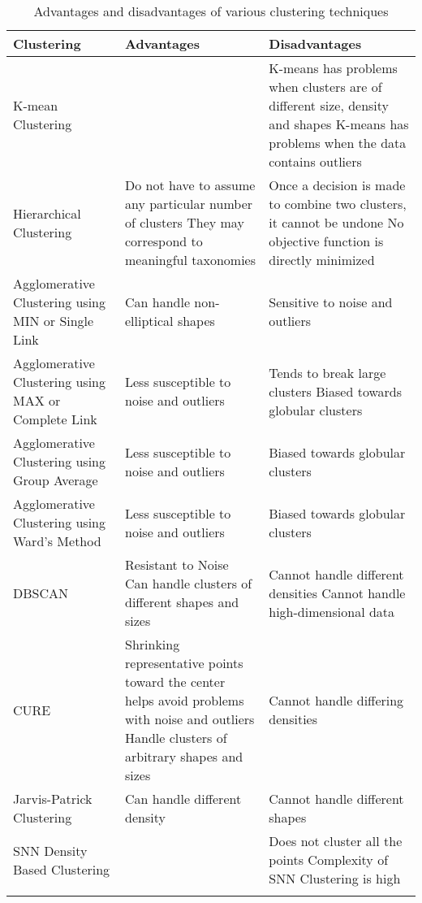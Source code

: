 \begin{longtable}{ | P{3cm} | P{5cm} | P{5cm} | } 
\hline
    \textbf{Clustering} & \textbf{Advantages} & \textbf{Disadvantages} \\ \hline
    K-mean Clustering & 
    &
        K-means has problems when clusters are of different size, density and shapes \newline \newline
        K-means has problems when the data contains outliers
    \\ \hline
    Hierarchical Clustering &
        Do not have to assume any particular number of clusters \newline \newline
        They may correspond to meaningful taxonomies 
    &
        Once a decision is made to combine two clusters, it cannot be undone \newline \newline
        No objective function is directly minimized
    \\ \hline
    Agglomerative Clustering using MIN or Single Link & 
        Can handle non-elliptical shapes
    &
        Sensitive to noise and outliers
    \\ \hline
    Agglomerative Clustering using MAX or Complete Link &
        Less susceptible to noise and outliers
    &
        Tends to break large clusters \newline \newline
        Biased towards globular clusters
    \\ \hline
    Agglomerative Clustering using Group Average &
        Less susceptible to noise and outliers
    &
        Biased towards globular clusters
    \\ \hline
        Agglomerative Clustering using Ward's Method &
        Less susceptible to noise and outliers
    &
        Biased towards globular clusters
    \\ \hline
    DBSCAN &
        Resistant to Noise \newline \newline
        Can handle clusters of different shapes and sizes 
    &
        Cannot handle different densities \newline \newline
        Cannot handle high-dimensional data
    \\ \hline
    CURE &
        Shrinking representative points toward the center helps avoid problems with noise and outliers \newline \newline
        Handle clusters of arbitrary shapes and sizes
    &
        Cannot handle differing densities
    \\ \hline
    Jarvis-Patrick Clustering &
        Can handle different density
    &
        Cannot handle different shapes
    \\ \hline
    SNN Density Based Clustering &
    &
        Does not cluster all the points
        Complexity of SNN Clustering is high
    \\ \hline
\caption{Advantages and disadvantages of various clustering techniques}
\label{table:2}
\end{longtable}

